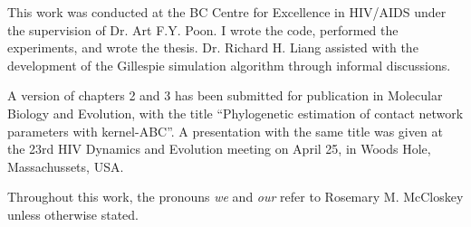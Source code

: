 This work was conducted at the BC Centre for Excellence in HIV/AIDS under the
supervision of Dr. Art F.Y. Poon. I wrote the code, performed the experiments, and
wrote the thesis. Dr. Richard H. Liang assisted with the development of the
Gillespie simulation algorithm through informal discussions. 

A version of chapters 2 and 3 has been submitted for publication in Molecular
Biology and Evolution, with the title ``Phylogenetic estimation of contact
network parameters with kernel-ABC''. A presentation with the same title was
given at the 23rd HIV Dynamics and Evolution meeting on April 25, in Woods
Hole, Massachussets, USA.

Throughout this work, the pronouns \textit{we} and \textit{our} refer to
Rosemary M. McCloskey unless otherwise stated.
